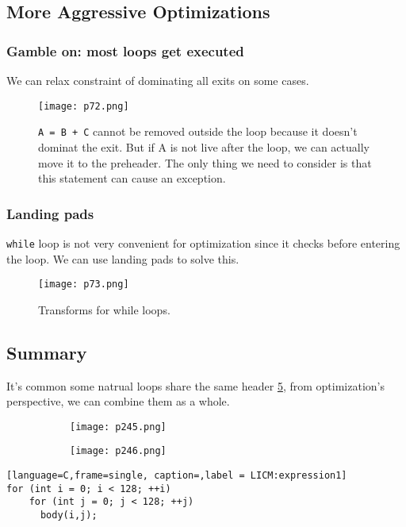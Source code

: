 \subsection{More Aggressive Optimizations}

\subsubsection{Gamble on: most loops get executed}

We can relax constraint of dominating all exits on some cases.

\begin{figure}[H]
    \centering
     \texttt{[image: p72.png]}
         \caption{\texttt{A = B + C} cannot be removed outside the loop because it doesn't dominat the exit. But if A is not live after the loop, we can actually move it to the preheader. The only thing we need to consider is that this statement can cause an exception.}
         \label{fig:p72}
\end{figure}


\subsubsection{Landing pads}
\texttt{while} loop is not very convenient for optimization since it checks before entering the loop.  We can use landing pads to solve this.

\begin{figure}[H]
    \centering
     \texttt{[image: p73.png]}
         \caption{Transforms for while loops.}
         \label{fig:p73}
\end{figure}





\subsection{Summary}

It's common some natrual loops share the same header \ref{fig:p245-6}, from optimization's perspective, we can combine them as a whole. 


\begin{figure}[H]
    \centering
    \begin{subfigure}{0.3\textwidth}
    \centering
        \texttt{[image: p245.png]}
        \caption{}
        \label{fig:p256}
    \end{subfigure}
    \begin{subfigure}{0.4\textwidth}
    \centering
        \texttt{[image: p246.png]}
        \caption{}
        \label{fig:p246}
    \end{subfigure}
    
    \caption{}
       \label{fig:p245-6}
\end{figure}


\begin{lstlisting}[language=C,frame=single, caption=,label = LICM:expression1]
for (int i = 0; i < 128; ++i)
    for (int j = 0; j < 128; ++j)
      body(i,j);
  
\end{lstlisting}



